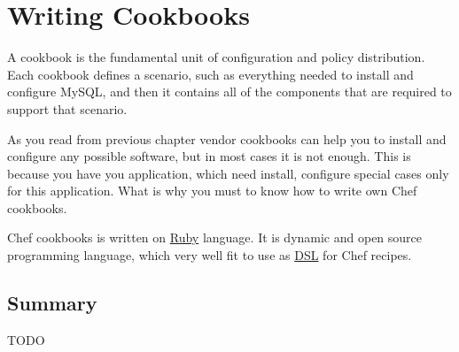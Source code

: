 \chapter{Writing Cookbooks}

A cookbook is the fundamental unit of configuration and policy distribution. Each cookbook defines a scenario, such as everything needed to install and configure MySQL, and then it contains all of the components that are required to support that scenario.

As you read from previous chapter vendor cookbooks can help you to install and configure any possible software, but in most cases it is not enough. This is because you have you application, which need install, configure special cases only for this application. What is why you must to know how to write own Chef cookbooks.

Chef cookbooks is written on \href{https://www.ruby-lang.org}{Ruby} language. It is dynamic and open source programming language, which very well fit to use as \href{http://en.wikipedia.org/wiki/Domain-specific\_language}{DSL} for Chef recipes.












\section{Summary}

TODO